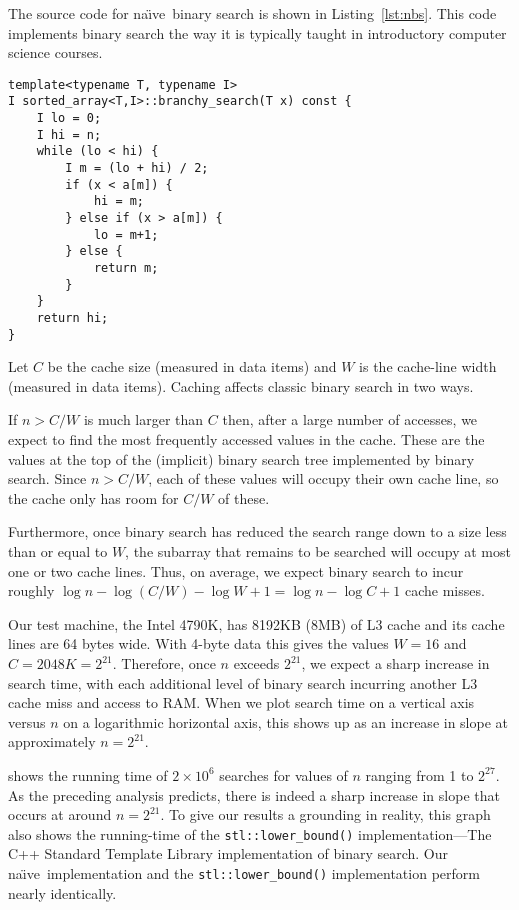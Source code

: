 \documentclass{patmorin}
\newcommand{\lstlabel}[1]{\label{lst:#1}}
\newcommand{\lstref}[1]{Listing~\ref{lst:#1}}
\newcommand{\naive}{na\"{\i}ve}
\begin{document}
The source code for \naive\ binary search is shown in
\lstref{nbs}. This code implements binary search the way it is typically
taught in introductory computer science courses.

\begin{listing}
\begin{verbatim}
template<typename T, typename I>
I sorted_array<T,I>::branchy_search(T x) const {
    I lo = 0;
    I hi = n;
    while (lo < hi) {
        I m = (lo + hi) / 2;
        if (x < a[m]) {
            hi = m;
        } else if (x > a[m]) {
            lo = m+1;
        } else {
            return m;
        }
    }
    return hi;
}
\end{verbatim}
\caption{Source code for \naive\ binary search.}
\lstlabel{nbs}
\end{listing}

Let $C$ be the cache size (measured in data items) and $W$ is the
cache-line width (measured in data items).  Caching affects classic
binary search in two ways.

If $n> C/W$ is much larger than $C$ then, after a large number of
accesses, we expect to find the most frequently accessed values in the
cache.  These are the values at the top of the (implicit) binary search
tree implemented by binary search.  Since $n>C/W$, each of these values
will occupy their own cache line, so the cache only has room for $C/W$
of these.

Furthermore, once binary search has reduced the search range down to a
size less than or equal to $W$, the subarray that remains to be searched
will occupy at most one or two cache lines. Thus, on average, we expect
binary search to incur roughly $\log n -\log(C/W) - \log W + 1 = \log n -
\log C + 1$ cache misses.

Our test machine, the Intel 4790K, has 8192KB (8MB) of L3 cache and its
cache lines are 64 bytes wide.  With 4-byte data this gives the values
$W=16$ and $C=2048K=2^{21}$.  Therefore, once $n$ exceeds $2^{21}$, we
expect a sharp increase in search time, with each additional level of
binary search incurring another L3 cache miss and access to RAM.  When we
plot search time on a vertical axis versus $n$ on a logarithmic horizontal
axis, this shows up as an increase in slope at approximately $n=2^{21}$.

 shows the running time of $2\times 10^6$ searches
for values of $n$ ranging from 1 to $2^{27}$. As the preceding analysis
predicts, there is indeed a sharp increase in slope that occurs at around
$n=2^{21}$.  To give our results a grounding in reality, this graph
also shows the running-time of the \texttt{stl::lower_bound()}
implementation---The C++ Standard Template Library implementation
of binary search.  Our \naive\ implementation and the
\texttt{stl::lower_bound()} implementation perform nearly
identically.
\end{document}
